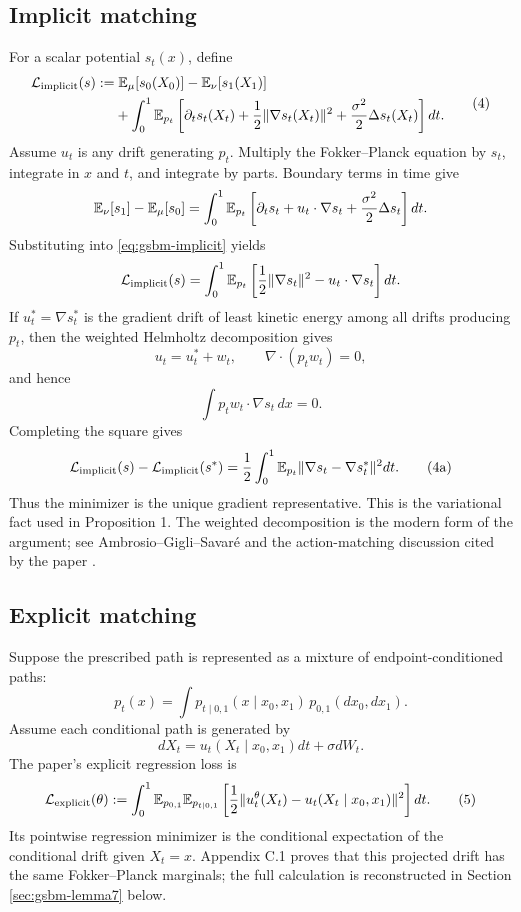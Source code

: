 \subsection{Implicit matching}
For a scalar potential $s_t(x)$, define
\begin{equation}
\begin{split}
  \mathcal L_{\mathrm{implicit}}(s)
  :=&\;\mathbb{E}_{\mu}[s_0(X_0)]-\mathbb{E}_{\nu}[s_1(X_1)]\\
   &+\int_0^1\mathbb{E}_{p_t}\left[
      \partial_t s_t(X_t)
      +\frac12\|\nabla s_t(X_t)\|^2
      +\frac{\sigma^2}{2}\Delta s_t(X_t)
   \right]dt.
\end{split}
\tag{4}\label{eq:gsbm-implicit}
\end{equation}
Assume $u_t$ is any drift generating $p_t$.  Multiply the Fokker--Planck
equation by $s_t$, integrate in $x$ and $t$, and integrate by parts.  Boundary
terms in time give
\[
  \mathbb{E}_{\nu}[s_1]-\mathbb{E}_{\mu}[s_0]
  =\int_0^1\mathbb{E}_{p_t}\left[
    \partial_t s_t+u_t\cdot\nabla s_t
    +\frac{\sigma^2}{2}\Delta s_t
  \right]dt.
\]
Substituting into \eqref{eq:gsbm-implicit} yields
\[
  \mathcal L_{\mathrm{implicit}}(s)
  =\int_0^1\mathbb{E}_{p_t}\left[
    \frac12\|\nabla s_t\|^2-u_t\cdot\nabla s_t
  \right]dt.
\]
If $u_t^*=\nabla s_t^*$ is the gradient drift of least kinetic energy among all
drifts producing $p_t$, then the weighted Helmholtz decomposition gives
\[
  u_t=u_t^*+w_t,
  \qquad
  \nabla\!\cdot(p_t w_t)=0,
\]
and hence
\[
  \int p_t w_t\cdot\nabla s_t\,dx=0.
\]
Completing the square gives
\begin{equation}
  \mathcal L_{\mathrm{implicit}}(s)
  -\mathcal L_{\mathrm{implicit}}(s^*)
  =\frac12\int_0^1\mathbb{E}_{p_t}
    \|\nabla s_t-\nabla s_t^*\|^2dt.
  \tag{4a}\label{eq:gsbm-implicit-square}
\end{equation}
Thus the minimizer is the unique gradient representative.  This is the
variational fact used in Proposition 1.  The weighted decomposition is the
modern form of the argument; see Ambrosio--Gigli--Savar\'e
\cite{AmbrosioGigliSavare2008} and the action-matching discussion cited by the
paper \cite{NeklyudovEtAl2023}.

\subsection{Explicit matching}
Suppose the prescribed path is represented as a mixture of endpoint-conditioned
paths:
\[
  p_t(x)=\int p_{t\mid0,1}(x\mid x_0,x_1)
  \,p_{0,1}(dx_0,dx_1).
\]
Assume each conditional path is generated by
\[
  dX_t=u_t(X_t\mid x_0,x_1)dt+\sigma dW_t.
\]
The paper's explicit regression loss is
\begin{equation}
  \mathcal L_{\mathrm{explicit}}(\theta)
  :=\int_0^1\mathbb{E}_{p_{0,1}}
    \mathbb{E}_{p_{t\mid0,1}}
    \left[\frac12
      \|u_t^\theta(X_t)-u_t(X_t\mid x_0,x_1)\|^2
    \right]dt.
  \tag{5}\label{eq:gsbm-explicit}
\end{equation}
Its pointwise regression minimizer is the conditional expectation of the
conditional drift given $X_t=x$.  Appendix C.1 proves that this projected drift
has the same Fokker--Planck marginals; the full calculation is reconstructed in
Section \ref{sec:gsbm-lemma7} below.

